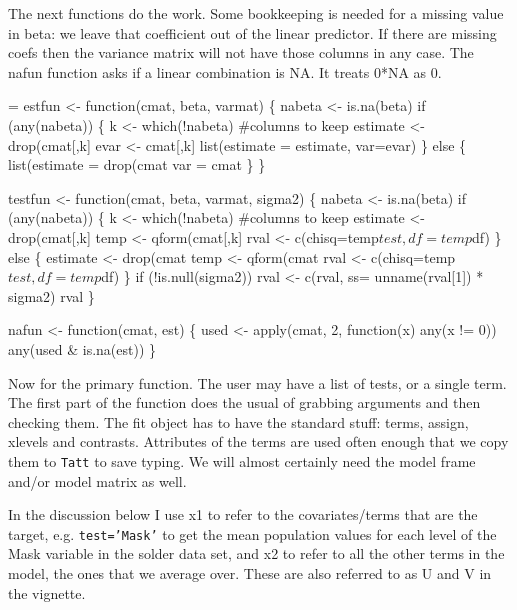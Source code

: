 \documentclass{article}
\newcommand{\code}[1]{\texttt{#1}}
\begin{document}
The next functions do the work.  Some bookkeeping is needed for 
a missing value in beta: we leave that coefficient out of the linear
predictor.
If there are missing coefs then the variance matrix will not have those 
columns in any case.
The nafun function asks if a linear combination is NA.  It treats
0*NA as 0.

\begin{nwchunk}
=
 estfun <- function(cmat, beta, varmat) \{
     nabeta <- is.na(beta)
     if (any(nabeta)) \{
         k <- which(!nabeta)  #columns to keep
         estimate <- drop(cmat[,k] %
         evar <- cmat[,k] %
         list(estimate = estimate, var=evar)
     \}
     else \{
         list(estimate = drop(cmat %
              var = cmat %
     \}
 \}
              
 testfun <- function(cmat, beta, varmat, sigma2) \{
     nabeta <- is.na(beta)
     if (any(nabeta)) \{
         k <- which(!nabeta)  #columns to keep
         estimate <- drop(cmat[,k] %
         temp <- qform(cmat[,k] %
         rval <- c(chisq=temp$test, df=temp$df)
     \}
     else \{
        estimate <- drop(cmat %
        temp <- qform(cmat %
        rval <- c(chisq=temp$test, df=temp$df)
        \}
     if (!is.null(sigma2)) rval <- c(rval, ss= unname(rval[1]) * sigma2)
     rval
 \}
 
 nafun <- function(cmat, est) \{
     used <- apply(cmat, 2, function(x) any(x != 0))
     any(used & is.na(est))
     \}
\end{nwchunk}
Now for the primary function.
The user may have a list of tests, or a single term.
The first part of the function does the usual of grabbing arguments
and then checking them.
The fit object has to have the standard stuff: terms, assign, xlevels
and contrasts. 
Attributes of the terms are used often enough that we copy them
to \code{Tatt} to save typing.
We will almost certainly need the model frame and/or model matrix as
well.

In the discussion below I use x1 to refer to the covariates/terms that are
the target, e.g. \code{test='Mask'} to get the mean population values for
each level of the Mask variable in the solder data set, and x2 to refer to
all the other terms in the model, the ones that we average over.  
These are also referred to as U and V in the vignette.
\end{document}
